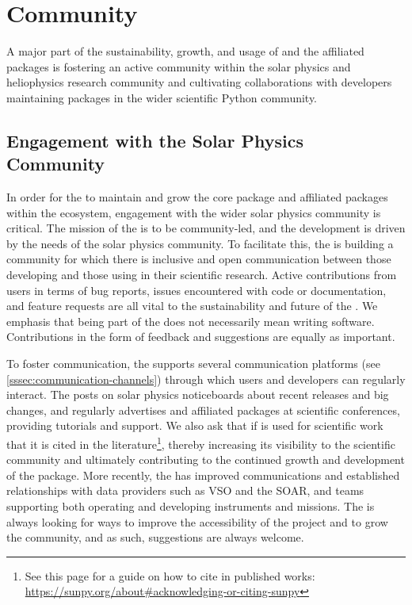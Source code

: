 \section{Community}
\label{sec:community}

A major part of the sustainability, growth, and usage of \sunpypkg and the affiliated packages is fostering an active community within the solar physics and heliophysics research community and cultivating collaborations with developers maintaining packages in the wider scientific Python community.

\subsection{Engagement with the Solar Physics Community}
\label{ssec:engagement-with-the-solar-physics-community}

In order for the \sunpyproj to maintain and grow the \sunpypkg core package and affiliated packages within the ecosystem, engagement with the wider solar physics community is critical.
The mission of the \sunpyproj is to be community-led, and the development is driven by the needs of the solar physics community.
To facilitate this, the \sunpyproj is building a community for which there is inclusive and open communication between those developing \sunpypkg and those using \sunpypkg in their scientific research.
Active contributions from users in terms of bug reports, issues encountered with code or documentation, and feature requests are all vital to the sustainability and future of the \sunpyproj.
We emphasis that being part of the \sunpyproj does not necessarily mean writing software. Contributions in the form of feedback and suggestions are equally as important.

To foster communication, the \sunpyproj supports several communication platforms (see \autoref{sssec:communication-channels}) through which users and developers can regularly interact.
The \sunpyproj posts on solar physics noticeboards about recent releases and big changes, and regularly advertises \sunpypkg and affiliated packages at scientific conferences, providing tutorials and support.
We also ask that if \sunpypkg is used for scientific work that it is cited in the literature\footnote{See this page for a guide on how to cite \sunpypkg in published works: \url{https://sunpy.org/about\#acknowledging-or-citing-sunpy}}, thereby increasing its visibility to the scientific community and ultimately contributing to the continued growth and development of the package.
More recently, the \sunpyproj has improved communications and established relationships with data providers such as VSO and the SOAR, and teams supporting both operating and developing instruments and missions.
The \sunpyproj is always looking for ways to improve the accessibility of the project and to grow the community, and as such, suggestions are always welcome.

